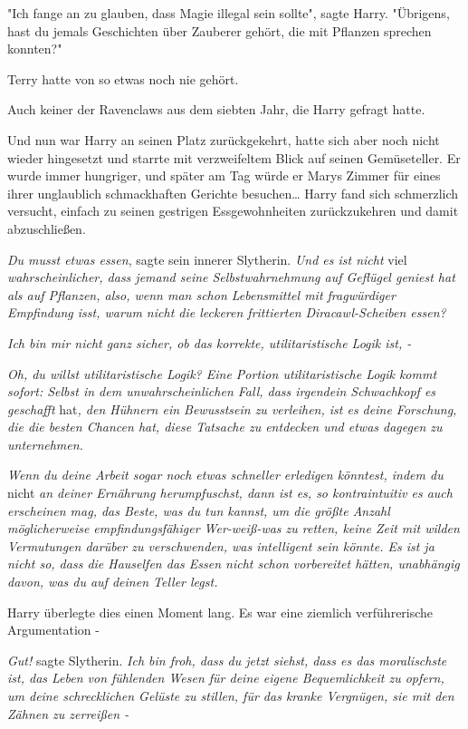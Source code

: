 {"Ich fange an zu glauben, dass Magie illegal sein sollte", sagte Harry. "Übrigens, hast du jemals Geschichten über Zauberer gehört, die mit Pflanzen sprechen konnten?"

Terry hatte von so etwas noch nie gehört.

Auch keiner der Ravenclaws aus dem siebten Jahr, die Harry gefragt hatte.

Und nun war Harry an seinen Platz zurückgekehrt, hatte sich aber noch nicht wieder hingesetzt und starrte mit verzweifeltem Blick auf seinen Gemüseteller. Er wurde immer hungriger, und später am Tag würde er Marys Zimmer für eines ihrer unglaublich schmackhaften Gerichte besuchen… Harry fand sich schmerzlich versucht, einfach zu seinen gestrigen Essgewohnheiten zurückzukehren und damit abzuschließen.

\emph{Du musst etwas essen}, sagte sein innerer Slytherin. \emph{Und es ist nicht} viel \emph{wahrscheinlicher, dass jemand seine Selbstwahrnehmung auf Geflügel geniest hat als auf Pflanzen, also, wenn man schon Lebensmittel mit fragwürdiger Empfindung isst, warum nicht die leckeren frittierten} \emph{Diracawl-Scheiben essen?}

\emph{Ich bin mir nicht ganz sicher, ob das korrekte, utilitaristische Logik ist, -}

\emph{Oh, du willst utilitaristische Logik? Eine Portion utilitaristische Logik kommt sofort: Selbst in dem unwahrscheinlichen Fall, dass irgendein Schwachkopf es geschafft} hat\emph{, den Hühnern ein Bewusstsein zu verleihen, ist es deine Forschung, die die besten Chancen hat, diese Tatsache zu entdecken und etwas dagegen zu unternehmen.}

\emph{Wenn du deine Arbeit sogar noch etwas schneller erledigen könntest, indem du} nicht \emph{an deiner Ernährung herumpfuschst, dann ist es, so kontraintuitiv es auch erscheinen mag, das Beste, was du tun kannst, um die größte Anzahl möglicherweise empfindungsfähiger Wer-weiß-was zu retten, keine Zeit mit wilden Vermutungen darüber zu verschwenden, was intelligent sein könnte. Es ist ja nicht so, dass die Hauselfen das Essen nicht schon vorbereitet hätten, unabhängig davon, was du auf deinen Teller legst.}

Harry überlegte dies einen Moment lang. Es war eine ziemlich verführerische Argumentation -

\emph{Gut!} sagte Slytherin. \emph{Ich bin froh, dass du jetzt siehst, dass es das moralischste ist, das Leben von fühlenden Wesen für deine eigene Bequemlichkeit zu opfern, um deine schrecklichen Gelüste zu stillen, für das kranke Vergnügen, sie mit den Zähnen zu zerreißen -}

}
